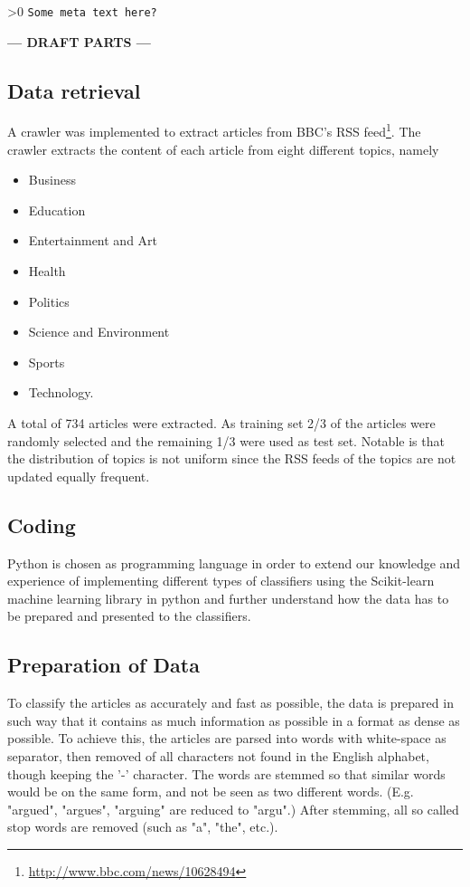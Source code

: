 \ifnum\printdraft>0
	\texttt{Some meta text here?}
\else
\begin{center}
	\textbf{--- DRAFT PARTS ---}
\end{center}
\fi
\subsection{Data retrieval}
A crawler was implemented to extract articles from BBC's RSS feed\footnote{\url{http://www.bbc.com/news/10628494}}. The crawler extracts the content of each article from eight different topics, namely
\begin{itemize}[noitemsep,nolistsep]
	\item Business
	\item Education
	\item Entertainment and Art
	\item Health
	\item Politics
	\item Science and Environment
	\item Sports
	\item Technology.
\end{itemize}
A total of 734 articles were extracted. As training set 2/3 of the articles were randomly selected and the remaining 1/3 were used as test set. Notable is that the distribution of topics is not uniform since the RSS feeds of the topics are not updated equally frequent. 
\subsection{Coding}
Python is chosen as programming language in order to extend our knowledge and experience of implementing different types of classifiers using the Scikit-learn machine learning library in python and further understand how the data has to be prepared and presented to the classifiers.
\subsection{Preparation of Data}
To classify the articles as accurately and fast as possible, the data is prepared in such way that it contains as much information as possible in a format as dense as possible. To achieve this, the articles are parsed into words with white-space as separator, then removed of all characters not found in the English alphabet, though keeping the '-' character. The words are stemmed so that similar words would be on the same form, and not be seen as two different words. (E.g. "argued", "argues", "arguing" are reduced to "argu".) After stemming, all so called stop words are removed (such as "a", "the", etc.). 
